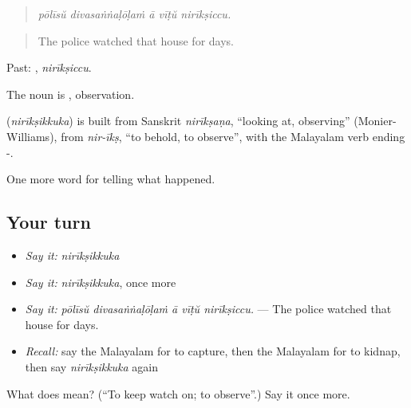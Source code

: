 \begin{quote}
\emph{pōlīsŭ divasaṅṅaḷōḷaṁ ā vīṭŭ nirīkṣiccu.}
\end{quote}

\begin{quote}
The police watched that house for days.
\end{quote}

Past: , \emph{nirīkṣiccu}.

The noun is , observation.

\begin{cousinweb}
\textbf{} (\emph{nirīkṣikkuka}) is built from Sanskrit \emph{nirīkṣaṇa}, \textquotedblleft{}looking at, observing\textquotedblright{} (Monier-Williams), from \emph{nir-īkṣ}, \textquotedblleft{}to behold, to observe\textquotedblright{}, with the Malayalam verb ending -.
\end{cousinweb}

\begin{grammarlens}[title={What you've built}]
One more word for telling what happened.
\end{grammarlens}

\subsection*{Your turn}
\begin{itemize}
\raggedright
  \item \emph{Say it:} \emph{nirīkṣikkuka}
  \item \emph{Say it:} \emph{nirīkṣikkuka}, once more
  \item \emph{Say it:} \emph{pōlīsŭ divasaṅṅaḷōḷaṁ ā vīṭŭ nirīkṣiccu.} — The police watched that house for days.
  \item \emph{Recall:} say the Malayalam for to capture, then the Malayalam for to kidnap, then say \emph{nirīkṣikkuka} again
\end{itemize}

\begin{tcolorbox}[breakable,colback=teal!4,colframe=teal!35!black,title={Before you move on}]
What does  mean? (\textquotedblleft{}To keep watch on; to observe\textquotedblright{}.) Say it once more.
\end{tcolorbox}
